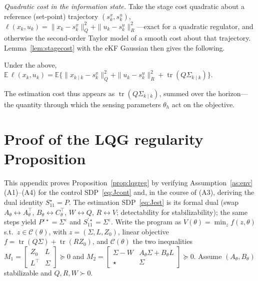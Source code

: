 \documentclass[twocolumn,amsthm]{autart}
\begin{document}
\emph{Quadratic cost in the information state.} Take the stage cost quadratic
about a reference (set-point) trajectory $(s_k^x,s_k^u)$,
$\ell(x_k,u_k) = \|x_k - s_k^x\|_Q^2 + \|u_k - s_k^u\|_R^2$---exact for a
quadratic regulator, and otherwise the second-order Taylor model of a smooth
cost about that trajectory. Lemma~\ref{lem:stagecost} with the eKF Gaussian then
gives the following.

\begin{lem}\label{lem:ekfcost}
Under the above, $\mathbb{E}\,\ell(x_k,u_k) = \mathbb{E}\{
\|x_{k\mid k} - s_k^x\|_Q^2 + \|u_k - s_k^u\|_R^2 +
\operatorname{tr}(Q\Sigma_{k\mid k})\}$.
\end{lem}

The estimation cost thus appears as $\operatorname{tr}(Q\Sigma_{k\mid k})$,
summed over the horizon---the quantity through which the sensing parameters
$\theta_h$ act on the objective.

\section{Proof of the LQG regularity Proposition}\label{app:lqgreg}

This appendix proves Proposition~\ref{prop:lqgreg} by verifying
Assumption~\ref{as:env}(A1)--(A4) for the control SDP~\eqref{eq:Jcont} and, in the
course of (A3), deriving the dual identity $S_{11}^\star=P$. The estimation
SDP~\eqref{eq:Jest} is its formal dual (swap $A_\theta\!\leftrightarrow
A_\theta^\top$, $B_\theta\!\leftrightarrow C_\theta^\top$, $W\!\leftrightarrow Q$,
$R\!\leftrightarrow V$; detectability for stabilizability); the same steps yield
$P^{\varepsilon\star}=\Sigma^\varepsilon$ and $S_{11}^{\prime\star}=
\Sigma^\varepsilon$. Write the program as $V(\theta)=\min_z f(z,\theta)$ s.t.\
$z\in\mathcal C(\theta)$, with $z=(\Sigma,L,Z_0)$, linear objective
$f=\operatorname{tr}(Q\Sigma)+\operatorname{tr}(RZ_0)$, and $\mathcal C(\theta)$ the
two inequalities $M_1=\left[\begin{smallmatrix}Z_0&L\\ L^\top&\Sigma
\end{smallmatrix}\right]\succeq0$ and $M_2=\left[\begin{smallmatrix}\Sigma-W&
A_\theta\Sigma+B_\theta L\\ \star&\Sigma\end{smallmatrix}\right]\succeq0$. Assume
$(A_\theta,B_\theta)$ stabilizable and $Q,R,W\succ0$.
\end{document}
